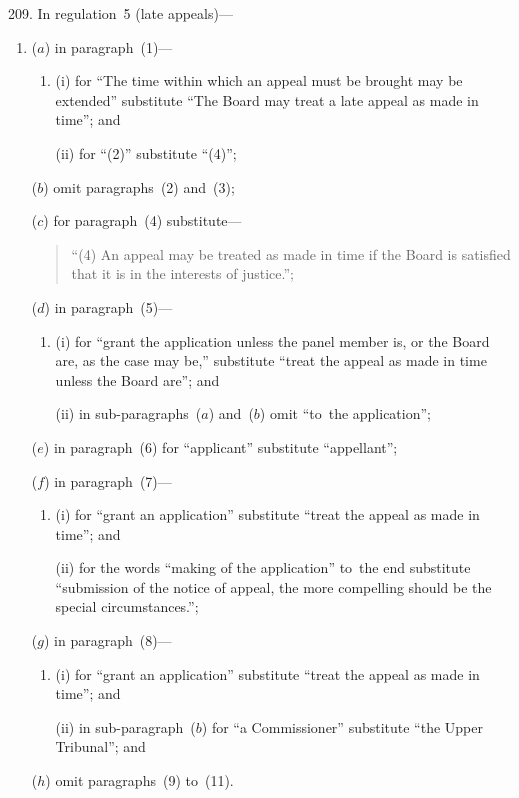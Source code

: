 \documentclass[12pt,a4paper]{article}
\begin{document}
209.  In regulation~5 (late appeals)—
\begin{enumerate}\item[]
($a$) in paragraph~(1)—
\begin{enumerate}\item[]
(i) for “The time within which an appeal must be brought may be extended” substitute “The Board may treat a late appeal as made in time”; and

(ii) for “(2)” substitute “(4)”;
\end{enumerate}

($b$) omit paragraphs~(2) and~(3);

($c$) for paragraph~(4) substitute—
\begin{quotation}
“(4) An appeal may be treated as made in time if the Board is satisfied that it is in the interests of justice.”;
\end{quotation}

($d$) in paragraph~(5)—
\begin{enumerate}\item[]
(i) for “grant the application unless the panel member is, or the Board are, as the case may be,” substitute “treat the appeal as made in time unless the Board are”; and

(ii) in sub-paragraphs~($a$)  and~($b$)  omit “to~the application”;
\end{enumerate}

($e$) in paragraph~(6) for “applicant” substitute “appellant”;

($f$) in paragraph~(7)—
\begin{enumerate}\item[]
(i) for “grant an application” substitute “treat the appeal as made in time”; and

(ii) for the words “making of the application” to~the end substitute “submission of the notice of appeal, the more compelling should be the special circumstances.”;
\end{enumerate}

($g$) in paragraph~(8)—
\begin{enumerate}\item[]
(i) for “grant an application” substitute “treat the appeal as made in time”; and

(ii) in sub-paragraph~($b$)  for “a Commissioner” substitute “the Upper Tribunal”; and
\end{enumerate}

($h$) omit paragraphs~(9) to~(11).
\end{enumerate}
\end{document}
